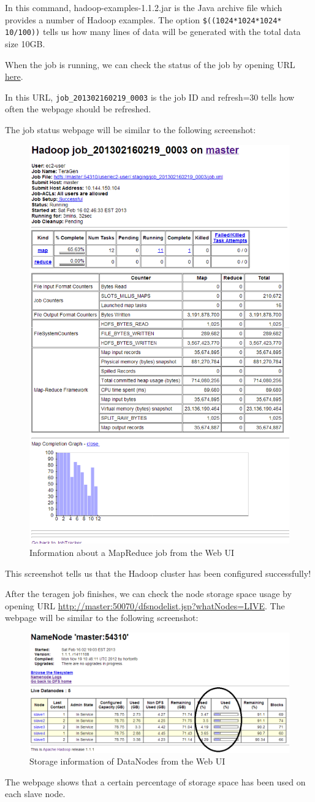 In this command, hadoop-examples-1.1.2.jar is the Java archive file which provides a number of Hadoop examples. The option \verb|$((1024*1024*1024* 10/100))| tells us how many lines of data will be generated with the total data size 10GB.

When the job is running, we can check the status of the job by opening URL \href{http://master:50030/jobdetails.jsp?jobid=job_201302160219_0003&refresh=30}{here}.

In this URL, \verb|job_201302160219_0003| is the job ID and refresh=30 tells how often the webpage should be refreshed.

The job status webpage will be similar to the following screenshot:
\begin{figure}[ht]
  \centering
  \includegraphics[width=.5\textwidth]{figs/5163os_03_06.png}
  \caption{Information about a MapReduce job from the Web UI}\label{fig:mapreduce.job}
\end{figure} 
This screenshot tells us that the Hadoop cluster has been configured successfully!

After the teragen job finishes, we can check the node storage space usage by opening URL \url{http://master:50070/dfsnodelist.jsp?whatNodes=LIVE}. The webpage will be similar to the following screenshot: \\
\begin{figure}[ht]
  \centering
  \includegraphics[width=.8\textwidth]{figs/5163os_03_07.png}
  \caption{Storage information of DataNodes from the Web UI}\label{fig:hdfs.storage}
\end{figure} 
The webpage shows that a certain percentage of storage space has been used on each slave node.

